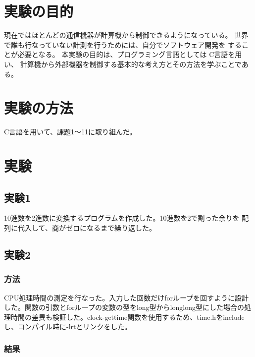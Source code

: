 \documentclass{jarticle}
\begin{document}
\section{実験の目的}

現在ではほとんどの通信機器が計算機から制御できるようになっている。
世界で誰も行なっていない計測を行うためには、自分でソフトウェア開発を
することが必要となる。
本実験の目的は、プログラミング言語としては C言語を用い、
計算機から外部機器を制御する基本的な考え方とその方法を学ぶことである。

\section{実験の方法}
C言語を用いて、課題1〜11に取り組んだ。

\section{実験}


\subsection{実験1}
10進数を2進数に変換するプログラムを作成した。10進数を2で割った余りを
配列に代入して、商がゼロになるまで繰り返した。



\subsection{実験2}
\subsubsection{方法}
CPU処理時間の測定を行なった。入力した回数だけforループを回すように設計した。関数の引数とforループの変数の型をlong型からlonglong型にした場合の処理時間の差異も検証した。clock-gettime関数を使用するため、time.hをincludeし、コンパイル時に-lrtとリンクをした。



\subsubsection{結果}
\end{document}
